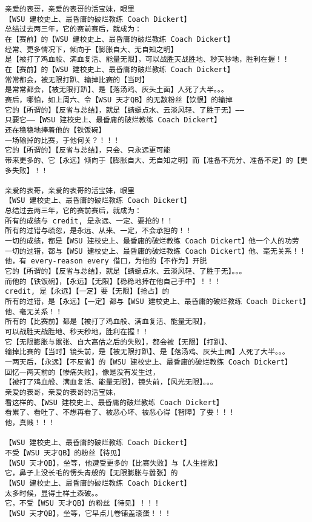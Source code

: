 \documentclass[9pt, b5paper]{article}
\begin{document}
\begin{verbatim}
亲爱的表哥，亲爱的表哥的活宝妹，眼里
【WSU 建校史上、最昏庸的破烂教练 Coach Dickert】
总结过去两三年，它的赛前赛后，就成为：
在【赛前】的【WSU 建校史上、最昏庸的破烂教练 Coach Dickert】
经常、更多情况下，倾向于【膨胀自大、无自知之明】
是【被打了鸡血般、满血复活、能量无限】，可以战胜天战胜地、秒天秒地，胜利在握！！
在【赛前】的【WSU 建校史上、最昏庸的破烂教练 Coach Dickert】
常常都会，被无限打趴、输掉比赛的【当时】
是常常都会，【被无限打趴】、是【落汤鸡、灰头土面】人死了大半。。。
赛后，哪怕，如上周六、令【WSU 天才QB】的无数粉丝【饮恨】的输掉
它的【所谓的】【反省与总结】，就是【蜻蜓点水、云淡风轻、了胜于无】——
只要它——【WSU 建校史上、最昏庸的破烂教练 Coach Dickert】
还在稳稳地捧着他的【铁饭碗】
一场输掉的比赛，于他何关？！！！
它的【所谓的】【反省与总结】，只会、只永远更可能
带来更多的、它【永远】倾向于【膨胀自大、无自知之明】而【准备不充分、准备不足】的【更多失败】！！

亲爱的表哥，亲爱的表哥的活宝妹，眼里
【WSU 建校史上、最昏庸的破烂教练 Coach Dickert】
总结过去两三年，它的赛前赛后，就成为：
所有的成绩与 credit, 是永远、一定、要抢的！！
所有的过错与疏忽，是永远、从来、一定，不会承担的！！
一切的成绩，都是【WSU 建校史上、最昏庸的破烂教练 Coach Dickert】他一个人的功劳
一切的过错，都与【WSU 建校史上、最昏庸的破烂教练 Coach Dickert】他、毫无关系！！
他，有 every-reason every 借口，为他的【不作为】开脱
它的【所谓的】【反省与总结】，就是【蜻蜓点水、云淡风轻、了胜于无】。。。
而他的【铁饭碗】，【永远】【无限】【稳稳地捧在他自己手中】！！！
credit, 是【永远】【一定】要【无限】【抢占】的
所有的过错，是【永远】【一定】都与【WSU 建校史上、最昏庸的破烂教练 Coach Dickert】他、毫无关系！！
所有的【比赛前】都是【被打了鸡血般、满血复活、能量无限】，
可以战胜天战胜地、秒天秒地，胜利在握！！
它【无限膨胀与嚣张、自大高估之后的失败】，都会被【无限】【打趴】、
输掉比赛的【当时】镜头前，是【被无限打趴】、是【落汤鸡、灰头土面】人死了大半。。。
一两天后，【永远】【不反省】的【WSU 建校史上、最昏庸的破烂教练 Coach Dickert】
回忆一两天前的【惨痛失败】，像是没有发生过，
【被打了鸡血般、满血复活、能量无限】，镜头前，【风光无限】。。。
亲爱的表哥，亲爱的表哥的活宝妹，
看这样的、【WSU 建校史上、最昏庸的破烂教练 Coach Dickert】
看累了、看吐了、不想再看了、被恶心坏、被恶心得【智障】了要！！！
他，真贱！！！

【WSU 建校史上、最昏庸的破烂教练 Coach Dickert】
不受【WSU 天才QB】的粉丝【待见】
【WSU 天才QB】，坐等，他遭受更多的【比赛失败】与【人生挫败】
它，鼻子上没长毛的愣头青般的【无限膨胀与嚣张】的
【WSU 建校史上、最昏庸的破烂教练 Coach Dickert】
太多时候，显得土样土森破。。
它，不受【WSU 天才QB】的粉丝【待见】！！！
【WSU 天才QB】，坐等，它早点儿卷铺盖滚蛋！！！


\end{verbatim}
\end{document}
